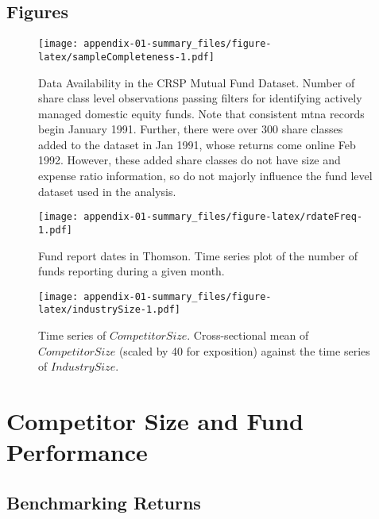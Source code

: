\documentclass[openany]{book}
\theoremstyle{definition}
\theoremstyle{definition}
\theoremstyle{definition}
\theoremstyle{remark}
\begin{document}
\hypertarget{figures}{%
\section{Figures}\label{figures}}

\begin{figure}
\centering
\texttt{[image: appendix-01-summary\_files/figure-latex/sampleCompleteness-1.pdf]}
\caption{\label{fig:sampleCompleteness}Data Availability in the CRSP Mutual
Fund Dataset. Number of share class level observations passing filters
for identifying actively managed domestic equity funds. Note that
consistent mtna records begin January 1991. Further, there were over 300
share classes added to the dataset in Jan 1991, whose returns come
online Feb 1992. However, these added share classes do not have size and
expense ratio information, so do not majorly influence the fund level
dataset used in the analysis.}
\end{figure}

\begin{figure}
\centering
\texttt{[image: appendix-01-summary\_files/figure-latex/rdateFreq-1.pdf]}
\caption{\label{fig:rdateFreq}Fund report dates in Thomson. Time series plot
of the number of funds reporting during a given month.}
\end{figure}

\begin{figure}
\centering
\texttt{[image: appendix-01-summary\_files/figure-latex/industrySize-1.pdf]}
\caption{\label{fig:industrySize}Time series of \(CompetitorSize\).
Cross-sectional mean of \(CompetitorSize\) (scaled by 40 for exposition)
against the time series of \(IndustrySize\).}
\end{figure}

\hypertarget{sec:CSandPerformance}{%
\chapter{Competitor Size and Fund
Performance}\label{sec:CSandPerformance}}

\hypertarget{sec:benchmark}{%
\section{Benchmarking Returns}\label{sec:benchmark}}
\end{document}
